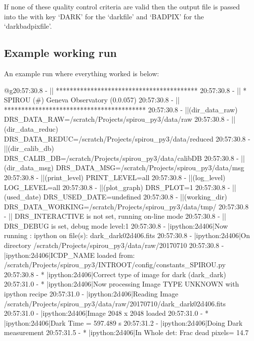 If none of these quality control criteria are valid then the output file is passed into the \calibdb with key `DARK' for the `darkfile' and `BADPIX' for the `darkbadpixfile'.

\newpage
\subsection{Example working run}

An example run where everything worked is below:

\begin{cmdboxprintspecial}
@g20:57:30.8 -   || ***************************************** 
20:57:30.8 -   || * SPIROU \@(#) Geneva Observatory (0.0.057) 
20:57:30.8 -   || ***************************************** 
20:57:30.8 -   ||(dir_data_raw)      DRS_DATA_RAW=/scratch/Projects/spirou_py3/data/raw 
20:57:30.8 -   ||(dir_data_reduc)    DRS_DATA_REDUC=/scratch/Projects/spirou_py3/data/reduced 
20:57:30.8 -   ||(dir_calib_db)      DRS_CALIB_DB=/scratch/Projects/spirou_py3/data/calibDB 
20:57:30.8 -   ||(dir_data_msg)      DRS_DATA_MSG=/scratch/Projects/spirou_py3/data/msg 
20:57:30.8 -   ||(print_level)       PRINT_LEVEL=all         %
20:57:30.8 -   ||(log_level)         LOG_LEVEL=all         %
20:57:30.8 -   ||(plot_graph)        DRS_PLOT=1            %
20:57:30.8 -   ||(used_date)         DRS_USED_DATE=undefined
20:57:30.8 -   ||(working_dir)       DRS_DATA_WORKING=/scratch/Projects/spirou_py3/data/tmp/
20:57:30.8 -   ||                    DRS_INTERACTIVE is not set, running on-line mode
20:57:30.8 -   ||                    DRS_DEBUG is set, debug mode level:1
20:57:30.8 -   |ipython:2d406|Now running : ipython on file(s): dark_dark02d406.fits
20:57:30.8 -   |ipython:2d406|On directory /scratch/Projects/spirou_py3/data/raw/20170710
20:57:30.8 -   |ipython:2d406|ICDP_NAME loaded from: /scratch/Projects/spirou_py3/INTROOT/config/constants_SPIROU.py
20:57:30.8 - * |ipython:2d406|Correct type of image for dark (dark_dark)
20:57:31.0 - * |ipython:2d406|Now processing Image TYPE UNKNOWN with ipython recipe
20:57:31.0 -   |ipython:2d406|Reading Image /scratch/Projects/spirou_py3/data/raw/20170710/dark_dark02d406.fits
20:57:31.0 -   |ipython:2d406|Image 2048 x 2048 loaded
20:57:31.0 - * |ipython:2d406|Dark Time = 597.489 s
20:57:31.2 -   |ipython:2d406|Doing Dark measurement
20:57:31.5 - * |ipython:2d406|In Whole det: Frac dead pixels= 14.7 %

\end{cmdboxprintspecial}
